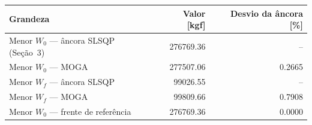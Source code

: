 \begin{tabular}{lrr}
\toprule
Grandeza & Valor [kgf] & Desvio da âncora [\%] \\
\midrule
Menor $W_0$ --- âncora SLSQP (Seção~3) & 276769.36 & -- \\
Menor $W_0$ --- MOGA & 277507.06 & 0.2665 \\
Menor $W_f$ --- âncora SLSQP & 99026.55 & -- \\
Menor $W_f$ --- MOGA & 99809.66 & 0.7908 \\
Menor $W_0$ --- frente de referência & 276769.36 & 0.0000 \\
\bottomrule
\end{tabular}